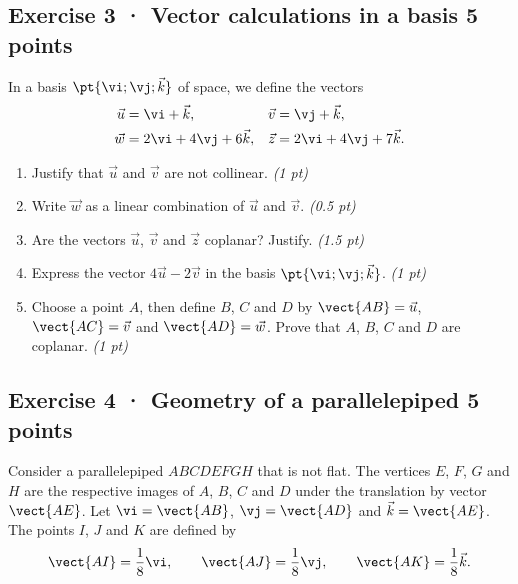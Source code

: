 \mxnewpage{}

\subsection*{Exercise 3 · Vector calculations in a basis \hfill 5 points}In a basis $\pt{\vi;\vj;\vec k}$ of space, we define the vectors
\[\begin{aligned}\vec u&=\vi+\vec k,&\vec v&=\vj+\vec k,\\
\vec w&=2\vi+4\vj+6\vec k,&\vec z&=2\vi+4\vj+7\vec k.\end{aligned}\]

\begin{enumerate}

\item Justify that $\vec u$ and $\vec v$ are not collinear. \hfill\textit{(1 pt)}

\item Write $\vec w$ as a linear combination of $\vec u$ and $\vec v$. \hfill\textit{(0.5 pt)}

\item Are the vectors $\vec u$, $\vec v$ and $\vec z$ coplanar? Justify. \hfill\textit{(1.5 pt)}

\item Express the vector $4\vec u-2\vec v$ in the basis $\pt{\vi;\vj;\vec k}$. \hfill\textit{(1 pt)}

\item Choose a point $A$, then define $B$, $C$ and $D$ by $\vect{AB}=\vec u$, $\vect{AC}=\vec v$ and $\vect{AD}=\vec w$. Prove that $A$, $B$, $C$ and $D$ are coplanar. \hfill\textit{(1 pt)}

\end{enumerate}

\subsection*{Exercise 4 · Geometry of a parallelepiped \hfill 5 points}Consider a parallelepiped $ABCDEFGH$ that is not flat. The vertices $E$, $F$, $G$ and $H$ are the respective images of $A$, $B$, $C$ and $D$ under the translation by vector $\vect{AE}$.
Let $\vi=\vect{AB}$, $\vj=\vect{AD}$ and $\vec k=\vect{AE}$.
The points $I$, $J$ and $K$ are defined by
\[\vect{AI}=\frac1{8}\vi,\qquad\vect{AJ}=\frac1{8}\vj,\qquad\vect{AK}=\frac1{8}\vec k.\]

